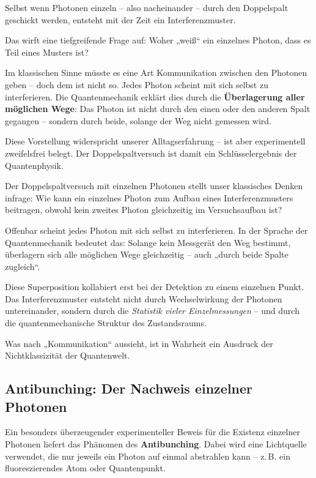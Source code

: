\begin{tcolorbox}[didaktikbox, title=Fazit: Ein scheinbar paradoxes Verhalten]
	\label{box:Fazit ein scheinbarer}
	\small
	Selbst wenn Photonen einzeln – also nacheinander – durch den Doppelspalt geschickt werden, entsteht mit der Zeit ein Interferenzmuster.
	
	Das wirft eine tiefgreifende Frage auf: Woher „weiß“ ein einzelnes Photon, dass es Teil eines Musters ist?
	
	Im klassischen Sinne müsste es eine Art Kommunikation zwischen den Photonen geben – doch dem ist nicht so. Jedes Photon scheint mit sich selbst zu interferieren. Die Quantenmechanik erklärt dies durch die \textbf{Überlagerung aller möglichen Wege}: Das Photon ist nicht durch den einen oder den anderen Spalt gegangen – sondern durch beide, solange der Weg nicht gemessen wird.
	
	Diese Vorstellung widerspricht unserer Alltagserfahrung – ist aber experimentell zweifelsfrei belegt. Der Doppelspaltversuch ist damit ein Schlüsselergebnis der Quantenphysik.
	
	Der Doppelspaltversuch mit einzelnen Photonen stellt unser klassisches Denken infrage:  
	Wie kann ein einzelnes Photon zum Aufbau eines Interferenzmusters beitragen, obwohl kein zweites Photon gleichzeitig im Versuchsaufbau ist?
	
	Offenbar scheint jedes Photon mit sich selbst zu interferieren. In der Sprache der Quantenmechanik bedeutet das: Solange kein Messgerät den Weg bestimmt, überlagern sich alle möglichen Wege gleichzeitig – auch „durch beide Spalte zugleich“.
	
	Diese Superposition kollabiert erst bei der Detektion zu einem einzelnen Punkt. Das Interferenzmuster entsteht nicht durch Wechselwirkung der Photonen untereinander, sondern durch die \emph{Statistik vieler Einzelmessungen} – und durch die quantenmechanische Struktur des Zustandsraums.
	
	Was nach „Kommunikation“ aussieht, ist in Wahrheit ein Ausdruck der Nichtklassizität der Quantenwelt.
\end{tcolorbox}

\subsection{Antibunching: Der Nachweis einzelner  Photonen}

Ein besonders überzeugender experimenteller Beweis für die Existenz einzelner Photonen liefert das Phänomen des \textbf{Antibunching}. Dabei wird eine Lichtquelle verwendet, die nur jeweils ein Photon auf einmal abstrahlen kann – z.\,B. ein fluoreszierendes Atom oder Quantenpunkt.

